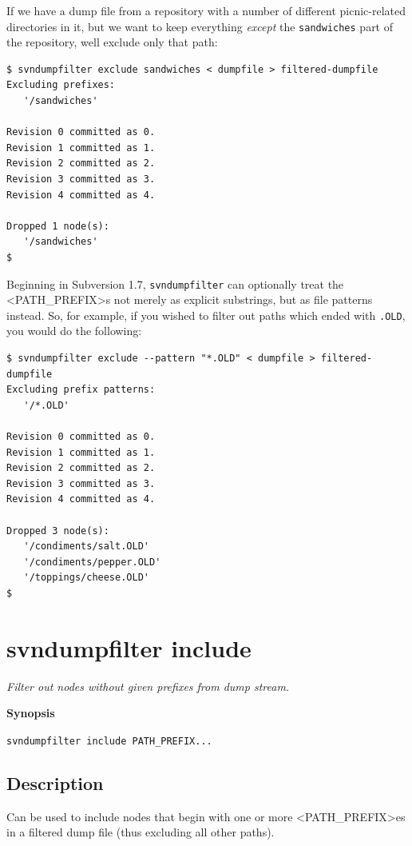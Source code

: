 If we have a dump file from a repository with a number of different
picnic-related directories in it, but we want to keep everything
\emph{except} the \texttt{sandwiches} part of the repository,
we\textquotesingle ll exclude only that path:

\begin{verbatim}
$ svndumpfilter exclude sandwiches < dumpfile > filtered-dumpfile
Excluding prefixes:
   '/sandwiches'

Revision 0 committed as 0.
Revision 1 committed as 1.
Revision 2 committed as 2.
Revision 3 committed as 3.
Revision 4 committed as 4.

Dropped 1 node(s):
   '/sandwiches'
$
\end{verbatim}

Beginning in Subversion 1.7, \texttt{svndumpfilter} can optionally treat
the \textless PATH\_PREFIX\textgreater s not merely as explicit
substrings, but as file patterns instead. So, for example, if you wished
to filter out paths which ended with \texttt{.OLD}, you would do the
following:

\begin{verbatim}
$ svndumpfilter exclude --pattern "*.OLD" < dumpfile > filtered-dumpfile
Excluding prefix patterns:
   '/*.OLD'

Revision 0 committed as 0.
Revision 1 committed as 1.
Revision 2 committed as 2.
Revision 3 committed as 3.
Revision 4 committed as 4.

Dropped 3 node(s):
   '/condiments/salt.OLD'
   '/condiments/pepper.OLD'
   '/toppings/cheese.OLD'
$
\end{verbatim}

\section{svndumpfilter
include}\label{svn.ref.svndumpfilter.commands.c.include}

\emph{Filter out nodes without given prefixes from dump stream.}

\textbf{Synopsis}

\texttt{svndumpfilter\ include\ PATH\_PREFIX...}

\subsection{Description}

Can be used to include nodes that begin with one or more
\textless PATH\_PREFIX\textgreater es in a filtered dump file (thus
excluding all other paths).

